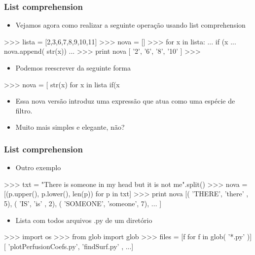 \documentclass[12pt,t,graphics]{beamer}
\newcommand{\ft}[1]{\frametitle{#1}}
\newcommand{\bi}{\begin{itemize}}
\newcommand{\ei}{\end{itemize}}
\begin{document}

\begin{frame}[fragile]
  \ft{List comprehension}
  \bi
\item Vejamos agora como realizar a seguinte operação
  usando list comprehension
  \ei
  \begin{python}
>>> lista = [2,3,6,7,8,9,10,11]
>>> nova = []
>>> for x in lista:
...     if (x%
...         nova.append( str(x))
...
>>> print nova
[ '2', '6', '8', '10' ]
>>>	
  \end{python}
  \bi
\item Podemos reescrever da seguinte forma
  \ei
  \begin{python}
>>> nova = [ str(x) for x in lista if(x%
  \end{python}
  \bi
\item Essa nova versão introduz uma expressão que atua
  como uma espécie de filtro.
\item Muito mais simples e elegante, não?
  \ei	
\end{frame}


\begin{frame}[fragile]
  \ft{List comprehension}
  \bi
\item Outro exemplo
  \ei
  \begin{python}
>>> txt = "There is someone in my head but it is not me".split()
>>> nova = [(p.upper(), p.lower(), len(p)) for p in txt]
>>> print nova
[( 'THERE', 'there' , 5),
( 'IS', 'is' , 2),
( 'SOMEONE', 'someone', 7),
...
]	
  \end{python}	
  \bi
\item Lista com todos arquivos .py de um diretório
  \ei
  \begin{python}
>>> import os
>>> from glob import glob
>>> files = [f for f in glob( '*.py' )]
[ 'plotPerfusionCoefs.py', 'findSurf.py' , ...]	
  \end{python}		
\end{frame}

\end{document}
